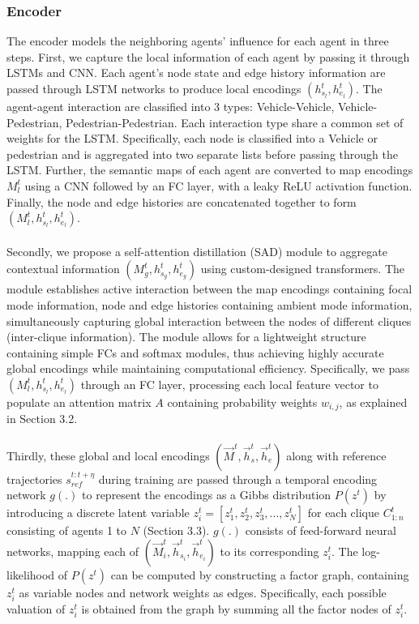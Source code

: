 \documentclass{article}
\begin{document}
\subsubsection{Encoder} 
The encoder models the neighboring agents' influence for each agent in three steps. First, we capture the local information of each agent by passing it through LSTMs and CNN. Each agent's node state and edge history information are passed through LSTM networks to produce local encodings $(h_{s_l}^t, h_{e_l}^t)$. The agent-agent interaction are classified into 3 types: Vehicle-Vehicle, Vehicle-Pedestrian, Pedestrian-Pedestrian. Each interaction type share a common set of weights for the LSTM.  Specifically, each node is classified into a Vehicle or pedestrian and is aggregated into two separate lists before passing through the LSTM.  Further, the semantic maps of each agent are converted to map encodings $M_l^t$ using a CNN followed by an FC layer, with a leaky ReLU activation function. Finally, the node and edge histories are concatenated together to form $(M_l^t, h_{s_l}^t, h_{e_l}^t)$. \\
\\
Secondly, we propose a self-attention
distillation (SAD) module \cite{hou2019learning} to aggregate contextual information $(M_g^t, h_{s_g}^t, h_{e_g}^t)$ using custom-designed transformers. The module establishes active interaction between the map encodings containing focal mode information, node and edge histories containing ambient mode information, simultaneously capturing global interaction between the nodes of different cliques (inter-clique information).  The module allows for a lightweight structure containing simple FCs and softmax modules, thus achieving highly accurate global encodings while maintaining computational efficiency.  Specifically, we pass  $(M_l^t, h_{s_l}^t, h_{e_l}^t)$ through an FC layer, processing each local feature vector  to populate an attention matrix $A$ containing probability weights $w_{i,j}$, as explained in Section 3.2. \\
\\
Thirdly, these global and local encodings $(\vec M^t, \vec h_{s}^t, \vec h_{e}^t)$ along with reference trajectories $s_{ref}^{t:t+\eta}$ during training are passed through a temporal encoding network $g(.)$ to represent the encodings as a Gibbs distribution $P(z^t)$ by introducing a discrete latent variable 
$z^t_i = [z^t_1, z^t_2, z^t_3, ..., z^t_N]$ for each clique $C^t_{1:n}$ consisting of agents 1 to $N$ (Section 3.3). $g(.)$ consists of feed-forward neural networks, mapping each of $(\vec M_i^t, \vec h_{s_i}^t, \vec h_{e_i}^t)$ to its corresponding $z_i^t$. The log-likelihood of $P(z^t)$ can be computed by constructing a factor graph, containing $z_i^t$ as variable nodes and network weights as edges. Specifically, each possible valuation of $z_i^t$ is obtained from the graph by summing all the factor nodes of $z_i^t$. 
\end{document}
